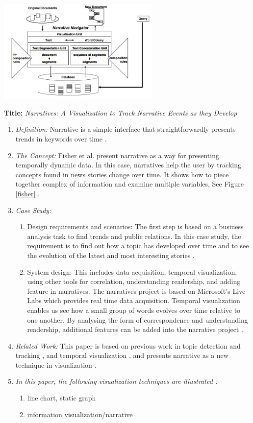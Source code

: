 \documentclass{egpubl}
\begin{document}
\begingroup
\centering
\includegraphics[width=8cm]{./images/akashi}
\label{akashi}
\endgroup


\textbf{Title:} \textit{Narratives: A Visualization to Track Narrative Events as they Develop}
\begin{enumerate}
\item \textit{Definition:} Narrative is a simple interface that straightforwardly presents trends in keywords over time \cite{fisher}.
\item \textit{The Concept:} Fisher et al. present narrative as a way for presenting temporally dynamic data. In this case, narratives help the user by tracking concepts found in news stories change over time. It shows how to piece together complex of information and examine multiple variables, See Figure \ref{fisher} \cite{fisher}.
\item \textit{Case Study:}
\begin{enumerate}
\item Design requirements and scenarios: The first step is based on a business analysis task to find trends and public relations. In this case study, the requirement is to find out how a topic has developed over time and to see the evolution of the latest and most interesting stories \cite{fisher}.
\item System design: This includes data acquisition, temporal visualization, using other tools for correlation, understanding readership, and adding feature in narratives. The narratives project is based on Microsoft's Live Labs which provides real time data acquisition. Temporal visualization enables us see how a small group of words evolves over time relative to one another. By analysing the form of correspondence and understanding readership, additional features can be added into the narrative project \cite{fisher}.
\end{enumerate}
\item \textit{Related Work:} This paper is based on previous work in topic detection and tracking\cite{dubinko2007} \cite{russell2000}, and temporal visualization \cite{van1999}, and presents narrative as a new technique in visualization \cite{fisher}.
\item \textit{In this paper, the following visualization techniques are illustrated :} 
\begin{enumerate}
\item line chart, static graph
\item information visualization/narrative
\end{enumerate}
\end{enumerate}
\end{document}
